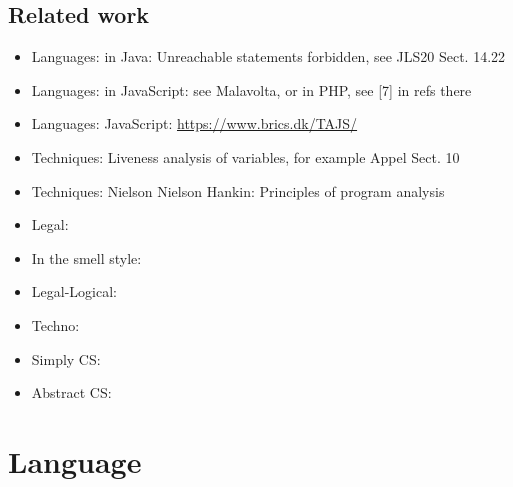 \documentclass{IOS-Book-Article}
\begin{document}
\subsection{Related work}
\begin{itemize}
\item Languages: in Java: Unreachable statements forbidden, see JLS20 Sect. 14.22
\item Languages: in JavaScript: see Malavolta, or in PHP, see [7] in refs there
\item Languages: JavaScript: \url{https://www.brics.dk/TAJS/}
\item Techniques: Liveness analysis of variables, for example Appel Sect. 10 \cite{appel98:_moder_compil_implem_java}
\item Techniques: Nielson Nielson Hankin: Principles of program analysis \cite{nielson_nielson_hankin_principles_program_analysis_2005}
\item Legal: \cite{coupette_hartung_etal_law_smells_2022}
\item In the smell style: \cite{romano_etal_2020}
\item Legal-Logical: \cite{fungwacharakorn_tsushima_satoh_legal_debugging_2021, fungwacharakorn_satoh_legal_rule_revision_debugging_2022}
\item Techno: \cite{scott_marcus_structured_legislation_2015}
\item Simply CS: \cite{neubauer_etal_accurate_dead_code_detection_2016}
\item Abstract CS: \cite{benton_relational_corr_proofs_static_analyses_2004}
\end{itemize}

\section{Language}\label{sec:language}







\end{document}

